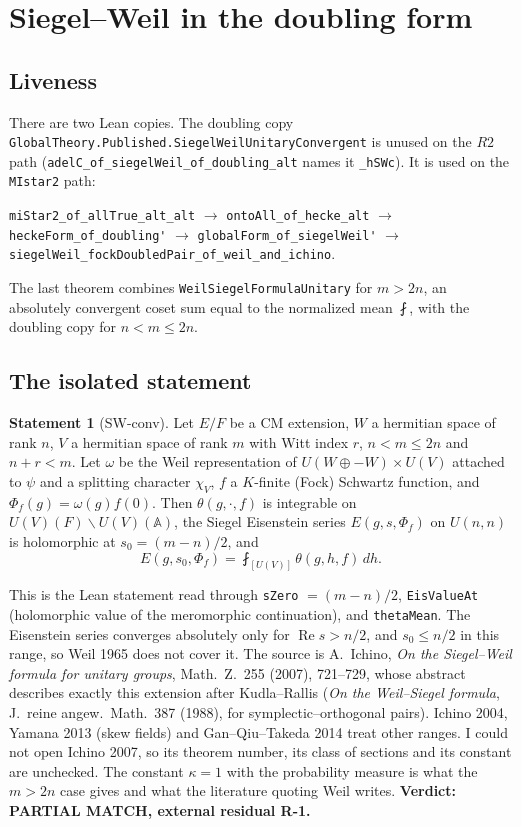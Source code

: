 \documentclass[11pt]{article}
\newcommand{\lean}[1]{\nolinkurl{#1}}
\theoremstyle{definition}
\newtheorem{statement}[lemma]{Statement}
\begin{document}
\section{Siegel--Weil in the doubling form}\label{sec:sw}

\subsection{Liveness}

There are two Lean copies. The doubling copy \lean{GlobalTheory.Published.SiegelWeilUnitaryConvergent} is unused on the $R2$ path (\lean{adelC_of_siegelWeil_of_doubling_alt} names it \lean{_hSWc}). It is used on the \lean{MIstar2} path:
\begin{center}
\lean{miStar2_of_allTrue_alt_alt} $\to$ \lean{ontoAll_of_hecke_alt} $\to$ \lean{heckeForm_of_doubling'} $\to$ \lean{globalForm_of_siegelWeil'} $\to$ \lean{siegelWeil_fockDoubledPair_of_weil_and_ichino}.
\end{center}
The last theorem combines \lean{WeilSiegelFormulaUnitary} for $m>2n$, an absolutely convergent coset sum equal to the normalized mean $\fint$, with the doubling copy for $n<m\le2n$.

\subsection{The isolated statement}

\begin{statement}[SW-conv]\label{st:sw}
Let $E/F$ be a CM extension, $W$ a hermitian space of rank $n$, $V$ a hermitian space of rank $m$ with Witt index $r$, $n<m\le2n$ and $n+r<m$. Let $\omega$ be the Weil representation of $U(W\oplus-W)\times U(V)$ attached to $\psi$ and a splitting character $\chi_V$, $f$ a $K$-finite (Fock) Schwartz function, and $\Phi_f(g)=\omega(g)f(0)$. Then $\theta(g,\cdot,f)$ is integrable on $U(V)(F)\backslash U(V)(\mathbb A)$, the Siegel Eisenstein series $E(g,s,\Phi_f)$ on $U(n,n)$ is holomorphic at $s_0=(m-n)/2$, and
\[
E(g,s_0,\Phi_f)=\fint_{[U(V)]}\theta(g,h,f)\,dh .
\]
\end{statement}

This is the Lean statement read through \lean{sZero} $=(m-n)/2$, \lean{EisValueAt} (holomorphic value of the meromorphic continuation), and \lean{thetaMean}. The Eisenstein series converges absolutely only for $\operatorname{Re}s>n/2$, and $s_0\le n/2$ in this range, so Weil 1965 does not cover it. The source is A.~Ichino, \emph{On the Siegel--Weil formula for unitary groups}, Math.\ Z.\ 255 (2007), 721--729, whose abstract describes exactly this extension after Kudla--Rallis (\emph{On the Weil--Siegel formula}, J.\ reine angew.\ Math.\ 387 (1988), for symplectic--orthogonal pairs). Ichino 2004, Yamana 2013 (skew fields) and Gan--Qiu--Takeda 2014 treat other ranges. I could not open Ichino 2007, so its theorem number, its class of sections and its constant are unchecked. The constant $\kappa=1$ with the probability measure is what the $m>2n$ case gives and what the literature quoting Weil writes. \textbf{Verdict: PARTIAL MATCH, external residual R-1.}
\end{document}
